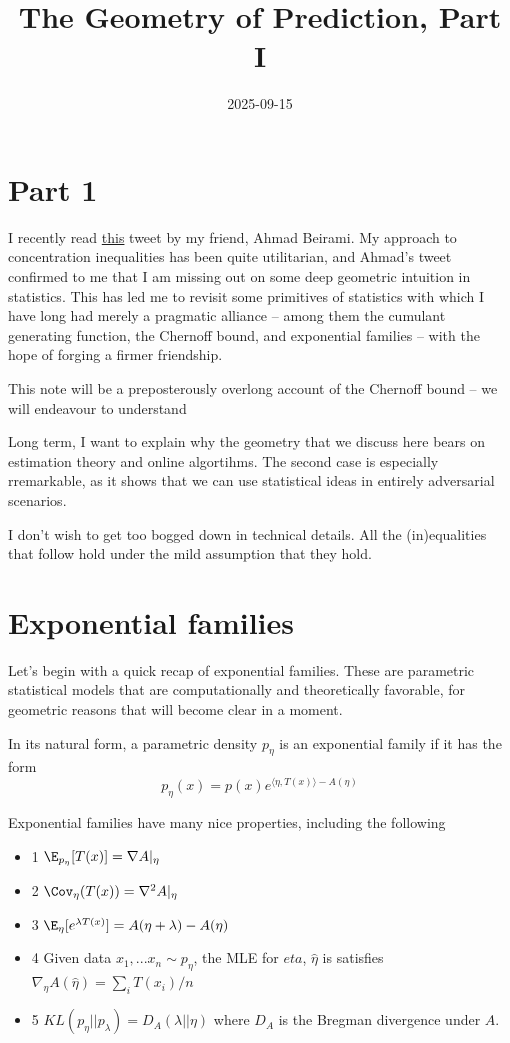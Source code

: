\documentclass[
  letterpaper,
  DIV=11,
  numbers=noendperiod]{scrartcl}
\title{The Geometry of Prediction, Part I}
\author{}
\date{2025-09-15}
\providecommand{\tightlist}{%
  \setlength{\itemsep}{0pt}\setlength{\parskip}{0pt}}
\begin{document}
\maketitle


\section{Part 1}\label{part-1}

I recently read
\href{https://x.com/abeirami/status/1963206009393930569}{this} tweet by
my friend, Ahmad Beirami. My approach to concentration inequalities has
been quite utilitarian, and Ahmad's tweet confirmed to me that I am
missing out on some deep geometric intuition in statistics. This has led
me to revisit some primitives of statistics with which I have long had
merely a pragmatic alliance -- among them the cumulant generating
function, the Chernoff bound, and exponential families -- with the hope
of forging a firmer friendship.

This note will be a preposterously overlong account of the Chernoff
bound -- we will endeavour to understand

Long term, I want to explain why the geometry that we discuss here bears
on estimation theory and online algortihms. The second case is
especially rremarkable, as it shows that we can use statistical ideas in
entirely adversarial scenarios.

I don't wish to get too bogged down in technical details. All the
(in)equalities that follow hold under the mild assumption that they
hold.

\section{Exponential families}\label{exponential-families}

Let's begin with a quick recap of exponential families. These are
parametric statistical models that are computationally and theoretically
favorable, for geometric reasons that will become clear in a moment.

In its natural form, a parametric density \(p_\eta\) is an exponential
family if it has the form
\[p_\eta(x) = p(x) e^{\langle \eta, T(x)\rangle - A(\eta)}\]

Exponential families have many nice properties, including the following

\begin{itemize}
\tightlist
\item
  1 \(\E_{p_\eta} [T(x)] = \nabla A |_\eta\)
\item
  2 \(\Cov_\eta(T(x)) = \nabla^2 A |_\eta\)
\item
  3 \(\E_\eta[e^{\lambda T(x)}] = A(\eta + \lambda) - A(\eta)\)
\item
  4 Given data \(x_1, ... x_n \sim p_\eta\), the MLE for \(eta\),
  \(\hat{\eta}\) is satisfies
  \(\nabla_\eta A(\hat\eta) = \sum_i T(x_i)/n\)
\item
  5 \(KL(p_\eta || p_\lambda) = D_A(\lambda || \eta)\) where \(D_A\) is
  the Bregman divergence under \(A\).
\end{itemize}
\end{document}
